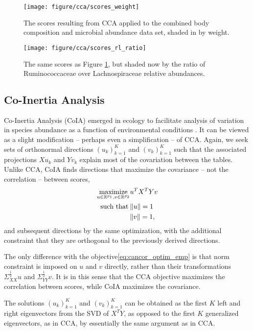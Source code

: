 \documentclass{article}
\begin{document}
\begin{figure}[ht]
  \centering
  \texttt{[image: figure/cca/scores\_weight]}
  \caption{The scores resulting from CCA applied to the combined body
    composition and microbial abundance data set, shaded in by
    weight.\label{fig:cca_scores_weight} }
\end{figure}

\begin{figure}[ht]
  \centering
  \texttt{[image: figure/cca/scores\_rl\_ratio]}
  \caption{The same scores as Figure \ref{fig:cca_scores_weight}, but shaded now by
    the ratio of Ruminococcaceae over Lachnospiraceae relative
    abundances. \label{fig:cca_scores_rl_ratio} }
\end{figure}

\subsection{Co-Inertia Analysis}

Co-Inertia Analysis (CoIA) emerged in ecology to facilitate analysis of
variation in species abundance as a function of environmental conditions
\cite{doledec1994co}. It can be viewed as a slight modification -- perhaps even
a simplification -- of CCA. Again, we seek sets of orthonormal directions
$\left(u_{k}\right)_{k = 1}^{K}$ and $\left(v_{k}\right)_{k = 1}^{K}$ such that
the associated projections $Xu_{k}$ and $Yv_{k}$ explain most of the covariation
between the tables. Unlike CCA, CoIA finds directions that maximize the
covariance -- not the correlation -- between scores,
\begin{align}
\mathop\mathrm{maximize}_{u \in \mathbb{R}^{p_{1}}, v \in \mathbb{R}^{p_{2}}} &u^{T}X^{T}Yv \\
\text{ such that}\medspace &\|u\| = 1\\
&\|v\| = 1,
\end{align}
and subsequent directions by the same optimization, with the
additional constraint that they are orthogonal to the previously
derived directions.

The only difference with the objective\ref{eq:cancor_optim_emp} is that norm
constraint is imposed on $u$ and $v$ directly, rather than their transformations
$\Sigma_{XX}^{\frac{1}{2}}u$ and $\Sigma_{YY}^{\frac{1}{2}}v$. It is in this
sense that the CCA objective maximizes the correlation between scores, while
CoIA maximizes the covariance.

The solutions $\left(u_{k}\right)_{k = 1}^{K}$ and $\left(v_{k}\right)_{k =
  1}^{K}$ can be obtained as the first $K$ left and right eigenvectors from the
SVD of $X^{T}Y$, as opposed to the first $K$ generalized eigenvectors, as in
CCA, by essentially the same argument as in CCA.
\end{document}
